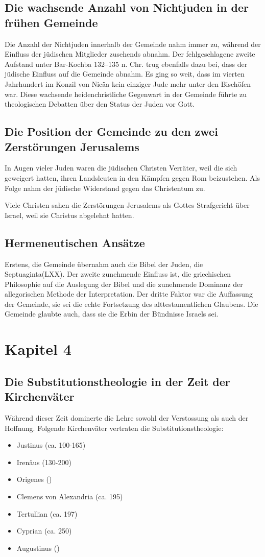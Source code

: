 \documentclass{../../inc/mybib}
\newcommand{\st}{Substitutionstheolog}
\begin{document}
    \subsection{Die wachsende Anzahl von Nichtjuden in der frühen Gemeinde}
    Die Anzahl der Nichtjuden innerhalb der Gemeinde nahm immer zu, während der Einfluss der jüdischen Mitglieder zusehends abnahm. Der fehlgeschlagene zweite Aufstand unter Bar-Kochba 132--135 n. Chr. trug ebenfalls dazu bei, dass der jüdische Einfluss auf die Gemeinde abnahm. Es ging so weit, dass im vierten Jahrhundert im Konzil von Nicäa kein einziger Jude mehr unter den Bischöfen war. Diese wachsende heidenchristliche Gegenwart in der Gemeinde führte zu theologischen Debatten über den Status der Juden vor Gott.
    \subsection{Die Position der Gemeinde zu den zwei Zerstörungen Jerusalems}
    In Augen vieler Juden waren die jüdischen Christen Verräter, weil die sich geweigert hatten, ihren Landsleuten in den Kämpfen gegen Rom beizustehen. Als Folge nahm der jüdische Widerstand gegen das Christentum zu.

    Viele Christen sahen die Zerstörungen Jerusalems als Gottes Strafgericht über Israel, weil sie Christus abgelehnt hatten.
    \subsection{Hermeneutischen Ansätze}
    Erstens, die Gemeinde übernahm auch die Bibel der Juden, die Septuaginta(LXX). Der zweite zunehmende Einfluss
    ist, die griechischen Philosophie auf die Auslegung der Bibel und die zunehmende Dominanz der allegorischen Methode der Interpretation. Der dritte Faktor war die Auffassung der Gemeinde, sie sei die echte Fortsetzung des alttestamentlichen Glaubens. Die Gemeinde glaubte auch, dass sie die Erbin der Bündnisse Israels sei.
    \section{Kapitel 4}
    \subsection{Die \st ie in der Zeit der Kirchenväter}
    Während dieser Zeit dominerte die Lehre sowohl der Verstossung als auch der Hoffnung.
    Folgende Kirchenväter vertraten die \st ie:
    \begin{itemize}
        \item Justinus (ca. 100-165)
        \item Irenäus (130-200)
        \item Origenes ()
        \item Clemens von Alexandria (ca. 195)
        \item Tertullian (ca. 197)
        \item Cyprian (ca. 250)
        \item Augustinus ()
    \end{itemize}
    
\end{document}
